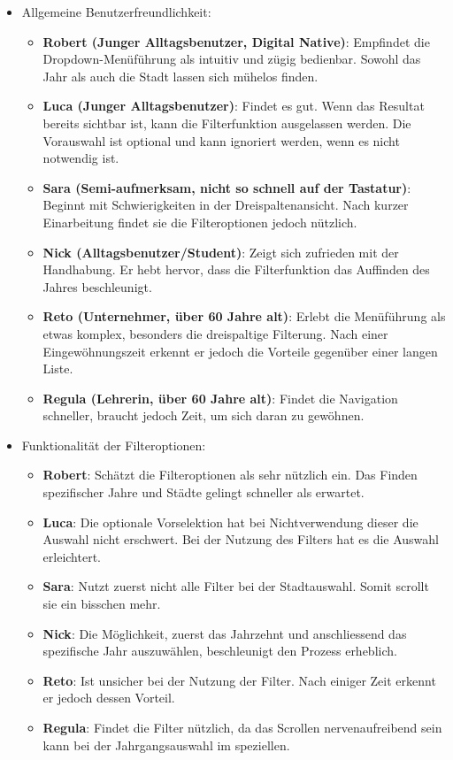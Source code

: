 \begin{itemize}
    \item Allgemeine Benutzerfreundlichkeit: 
    \begin{itemize}
        \item \textbf{Robert (Junger Alltagsbenutzer, Digital Native)}: 
              Empfindet die Drop\-down-Menü\-führung als intuitiv und zügig bedienbar. 
              Sowohl das Jahr als auch die Stadt lassen sich mühelos finden.
        \item \textbf{Luca (Junger Alltagsbenutzer)}:
              Findet es gut.
              Wenn das Resultat bereits sichtbar ist, kann die Filterfunktion ausgelassen werden.
              Die Vorauswahl ist optional und kann ignoriert werden, wenn es nicht notwendig ist.
        \item \textbf{Sara (Semi-aufmerksam, nicht so schnell auf der Tastatur)}:
              Beginnt mit Schwierigkeiten in der Dreispaltenansicht. 
              Nach kurzer Einarbeitung findet sie die Filteroptionen jedoch nützlich. 
        \item \textbf{Nick (Alltagsbenutzer/Student)}: 
              Zeigt sich zufrieden mit der Handhabung. 
              Er hebt hervor, dass die Filterfunktion das Auffinden des Jahres beschleunigt. 
        \item \textbf{Reto (Unternehmer, über 60 Jahre alt)}: 
              Erlebt die Menüführung als etwas komplex, besonders die dreispaltige Filterung. 
              Nach einer Eingewöhnungszeit erkennt er jedoch die Vorteile gegenüber einer langen Liste.
\item \textbf{Regula (Lehrerin, über 60 Jahre alt)}:
Findet die Navigation schneller, braucht jedoch Zeit, um sich daran zu gewöhnen.
    \end{itemize}
    \item Funktionalität der Filteroptionen: 
    \begin{itemize}
        \item \textbf{Robert}:
              Schätzt die Filteroptionen als sehr nützlich ein.
              Das Finden spezifischer Jahre und Städte gelingt schneller als erwartet.
        \item \textbf{Luca}: 
              Die optionale Vorselektion hat bei Nichtverwendung dieser die Auswahl nicht erschwert. 
              Bei der Nutzung des Filters hat es die Auswahl erleichtert. 
        \item \textbf{Sara}: 
              Nutzt zuerst nicht alle Filter bei der Stadtauswahl. 
              Somit scrollt sie ein bisschen mehr. 
        \item \textbf{Nick}: 
              Die Möglichkeit, zuerst das Jahrzehnt und anschliessend das spezifische Jahr auszuwählen, beschleunigt den Prozess erheblich. 
        \item \textbf{Reto}: 
              Ist unsicher bei der Nutzung der Filter. 
              Nach einiger Zeit erkennt er jedoch dessen Vorteil.
\item \textbf{Regula}:
Findet die Filter nützlich, da das Scrollen nervenaufreibend sein kann bei der Jahrgangsauswahl im speziellen.
\end{itemize}
\end{itemize}

